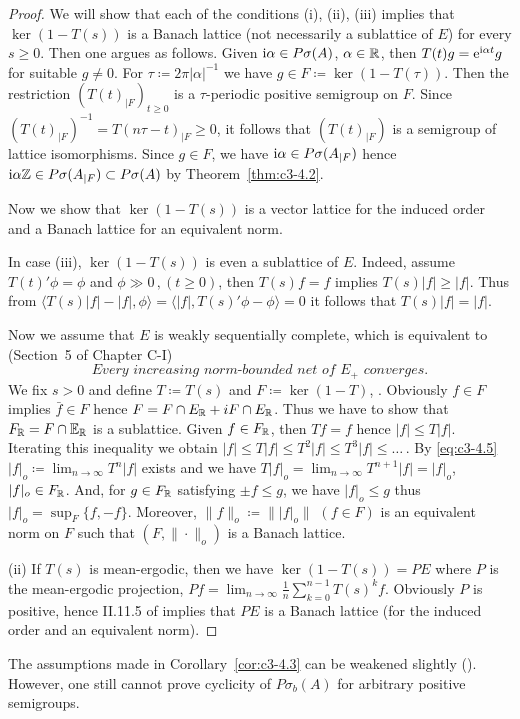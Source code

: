 \begin{proof}
	We will show that each of the conditions (i), (ii), (iii) implies that $\ker(1 - T(s))$ is a Banach lattice (not necessarily a sublattice of $E$) for every $s \geq 0$. 
	Then one argues as follows. Given $\mathrm{i}\alpha \in P\sigma(A)$, $\alpha \in \mathbb{R} $, then $T(t)g = \mathrm{e}^{\mathrm{i}\alpha t}g$ for suitable $g \neq 0$. 
	For $\tau \coloneqq  2\pi|\alpha|^{-1}$ we have $g \in F \coloneqq  \ker (1 - T(\tau))$. 
	Then the restriction $(T(t)_{|F})_{t \geq 0}$ is a $\tau$-periodic positive semigroup on $F$. 
	Since $\left(T(t)_{|F}\right)^{-1} = T(n\tau-t)_{|F} \geq 0$, it follows that $(T(t)_{|F})$ is a semigroup of lattice isomorphisms. 
	Since $g \in F$, we have $\mathrm{i}\alpha \in P\sigma(A_{|F})$ hence $\mathrm{i}\alpha\mathbb{Z} \in P\sigma(A_{|F}) \subset P\sigma(A)$ by Theorem~\ref{thm:c3-4.2}.
	
	Now we show that $\ker (1 - T(s))$ is a vector lattice for the induced order and a Banach lattice for an equivalent norm.
	
	In case (iii), $\ker (1 - T(s))$ is even a sublattice of $E$. 
	Indeed, assume $T(t)'\phi = \phi$ and $\phi \gg 0\,, (t \geq 0)$, then $T(s)f = f$ implies $T(s)|f| \geq |f|$. 
	Thus from $\langle T(s)|f| - |f|,\phi\rangle = \langle |f|,T(s)'\phi - \phi \rangle = 0$ it follows that $T(s)|f| = |f|$.
	
	Now we assume that $E$ is weakly sequentially complete, which is equivalent to (\cf Section~5 of Chapter C-I)
	\begin{equation}\label{eq:c3-4.5}
	\textit{Every increasing norm-bounded net of $E_{+}$ converges}.
	\end{equation}
	We fix $s > 0$ and define $T \coloneqq  T(s)$ and $F \coloneqq  \ker (1 - T)$, . 
	Obviously $f \in F$ implies $\bar{f} \in F$ hence $F = F\cap E_{\mathbb{R} } + iF\cap E_{\mathbb{R} }$. 
	Thus we have to show that $F_{\mathbb{R} } = F\cap\mathbb{E}_{\mathbb{R} }$ is a sublattice. 
	Given $f \in F_{\mathbb{R} }$, then $Tf = f$ hence $|f| \leq T|f|$. 
	Iterating this inequality we obtain $|f| \leq T|f| \leq T^{2}|f| \leq T^{3}|f| \leq \dots\,.$ 
	By \eqref{eq:c3-4.5} $|f|_{o} \coloneqq  \lim_{n\to \infty} T^{n}|f|$ exists and we have $T|f|_{o} = \lim_{n\to \infty} T^{n+1}|f| = |f|_{o}$, \ie $|f|_{o} \in F_{\mathbb{R} }$.
	And, for $g \in F_{\mathbb{R} }$ satisfying $\pm f \leq g$, we have $|f|_{o} \leq g$ thus $|f|_{o} = \sup_{F}\{f,-f\}$. 
	Moreover, $\|f\|_{o} \coloneqq  \||f|_{o}\|$ $(f \in F)$ is an equivalent norm on $F$ such that $(F,\|\cdot\|_{o})$ is a Banach lattice.
	
	(ii) If $T(s)$ is mean-ergodic, then we have $\ker (1 - T(s)) = PE$ where $P$ is the mean-ergodic projection, \ie $Pf = \lim_{n\to \infty}\frac{1}{n}\sum_{k=0}^{n-1}T(s)^{k}f$.
	Obviously $P$ is positive, hence II.11.5 of \citet{schaefer:1974} implies that $PE$ is a Banach lattice (for the induced order and an equivalent norm).
\end{proof}
The assumptions made in Corollary~\ref{cor:c3-4.3} can be weakened slightly (\cf \citet{greiner:1982}). 
However, one still cannot prove cyclicity of $P\sigma_{b}(A)$ for arbitrary positive semigroups.

